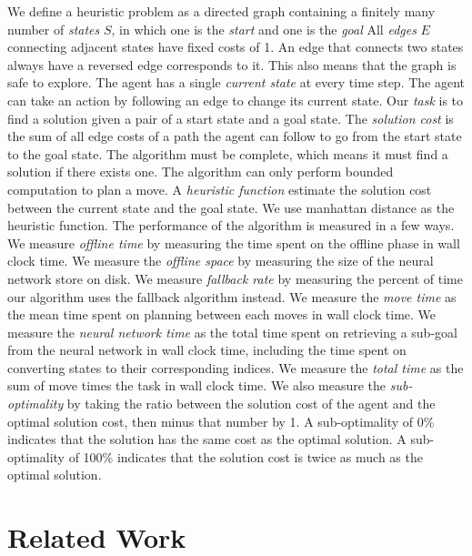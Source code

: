 \documentclass[letterpaper]{article}
\numberwithin{equation}{section}
\numberwithin{theorem}{section}
\numberwithin{lemma}{section}
\numberwithin{df}{section}
\begin{document}
    We define a heuristic problem as a directed graph containing a finitely many number of \textit{states} $S$, in which one is the \textit{start} and one is the \textit{goal}
    All \textit{edges} $E$ connecting adjacent states have fixed costs of 1.
    An edge that connects two states always have a reversed edge corresponds to it.
    This also means that the graph is safe to explore.
    The agent has a single \textit{current state} at every time step.
    The agent can take an action by following an edge to change its current state.
    Our \textit{task} is to find a solution given a pair of a start state and a goal state.
    The \textit{solution cost} is the sum of all edge costs of a path the agent can follow to go from the start state to the goal state.
    The algorithm must be complete, which means it must find a solution if there exists one.
    The algorithm can only perform bounded computation to plan a move.
    A \textit{heuristic function} estimate the solution cost between the current state and the goal state.
    We use manhattan distance as the heuristic function.
    The performance of the algorithm is measured in a few ways.
    We measure \textit{offline time} by measuring the time spent on the offline phase in wall clock time.
    We measure the \textit{offline space} by measuring the size of the neural network store on disk.
    We measure \textit{fallback rate} by measuring the percent of time our algorithm uses the fallback algorithm instead.
    We measure the \textit{move time} as the mean time spent on planning between each moves in wall clock time.
    We measure the \textit{neural network time} as the total time spent on retrieving a sub-goal from the neural network in wall clock time,
    including the time spent on converting states to their corresponding indices.
    We measure the \textit{total time} as the sum of move times the task in wall clock time.
    We also measure the \textit{sub-optimality} by taking the ratio between the solution cost of the agent and the optimal solution cost, then minus that number by 1.
    A sub-optimality of 0\% indicates that the solution has the same cost as the optimal solution.
    A sub-optimality of 100\% indicates that the solution cost is twice as much as the optimal solution.


    \section{Related Work}\label{sec:related-work}
\end{document}
